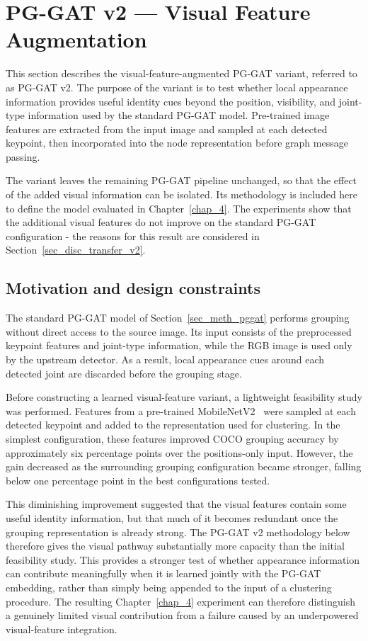 \section{PG-GAT v2 --- Visual Feature Augmentation}
\label{sec_meth_v2}

This section describes the visual-feature-augmented PG-GAT variant,
referred to as PG-GAT v2.
The purpose of the variant is to test whether local appearance
information provides useful identity cues beyond the position,
visibility, and joint-type information used by the standard PG-GAT model.
Pre-trained image features are extracted from the input image
and sampled at each detected keypoint,
then incorporated into the node representation
before graph message passing.

The variant leaves the remaining PG-GAT pipeline unchanged,
so that the effect of the added visual information can be isolated.
Its methodology is included here to define the model
evaluated in Chapter~\ref{chap_4}.
The experiments show that the additional visual features
do not improve on the standard PG-GAT configuration -
the reasons for this result are considered in
Section~\ref{sec_disc_transfer_v2}.

\subsection{Motivation and design constraints}
\label{sec_meth_v2_motivation}

The standard PG-GAT model of Section~\ref{sec_meth_pggat} performs
grouping without direct access to the source image.
Its input consists of the preprocessed keypoint features
and joint-type information,
while the RGB image is used only by the upstream detector.
As a result, local appearance cues around each detected joint
are discarded before the grouping stage.

Before constructing a learned visual-feature variant,
a lightweight feasibility study was performed.
Features from a pre-trained
MobileNetV2~\cite{sandler2018mobilenetv2} were sampled at each detected
keypoint and added to the representation used for clustering.
In the simplest configuration,
these features improved COCO grouping accuracy
by approximately six percentage points over the positions-only input.
However, the gain decreased as the surrounding grouping configuration
became stronger,
falling below one percentage point in the best configurations tested.

This diminishing improvement suggested that the visual features contain
some useful identity information,
but that much of it becomes redundant once the grouping representation
is already strong.
The PG-GAT v2 methodology below therefore gives the visual pathway
substantially more capacity than the initial feasibility study.
This provides a stronger test of whether appearance information
can contribute meaningfully when it is learned jointly
with the PG-GAT embedding,
rather than simply being appended to the input of a clustering procedure.
The resulting Chapter~\ref{chap_4} experiment can therefore distinguish
a genuinely limited visual contribution from a failure caused
by an underpowered visual-feature integration.

